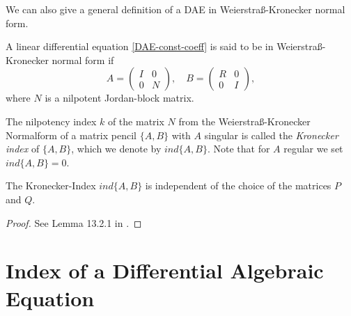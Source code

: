 We can also give a general definition of a DAE in Weierstraß-Kronecker normal form.
\begin{definition}
	A linear differential equation \eqref{DAE-const-coeff} is said to be in Weierstraß-Kronecker normal form if
	\begin{displaymath}
		A = 
		\left(
		\begin{matrix}
			I & 0 \\
			0 & N
		\end{matrix}
		\right), \quad
		B = 
		\left(
		\begin{matrix}
			R & 0 \\
			0 & I
		\end{matrix}
		\right),
	\end{displaymath}
	where $N$ is a nilpotent Jordan-block matrix.
\end{definition}

\begin{definition}
	The nilpotency index $k$ of the matrix $N$ from the Weierstraß-Kronecker Normalform of a matrix pencil $\{A,B\}$ with $A$ singular is called the \emph{Kronecker index} of $\{A,B\}$, which we denote by $ind\{A,B\}$. Note that for $A$ regular we set $ind\{A,B\} = 0$.
\end{definition}


\begin{lemma}
	\label{Lemma:indipendence of Kronecker index}
	The Kronecker-Index $ind\{A,B\}$ is independent of the choice of the matrices $P$ and $Q$.
\end{lemma}

\begin{proof}
	See Lemma 13.2.1 in .
\end{proof}





\section{Index of a Differential Algebraic Equation}

